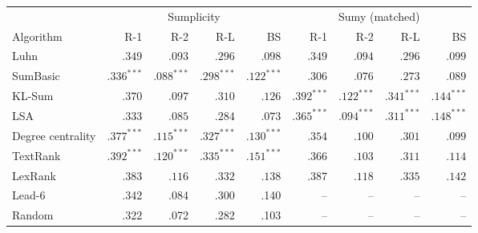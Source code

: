 \begin{tabular}{l r r r r r r r r}
\toprule
 & \multicolumn{4}{c}{Sumplicity} & \multicolumn{4}{c}{Sumy (matched)} \\
\cmidrule(lr){2-5}\cmidrule(lr){6-9}
Algorithm & R-1 & R-2 & R-L & BS & R-1 & R-2 & R-L & BS \\
\midrule
Luhn & $.349$ & $.093$ & $.296$ & $.098$ & $.349$ & $.094$ & $.296$ & $.099$ \\
SumBasic & $\mathbf{.336}^{***}$ & $\mathbf{.088}^{***}$ & $\mathbf{.298}^{***}$ & $\mathbf{.122}^{***}$ & $.306$ & $.076$ & $.273$ & $.089$ \\
KL-Sum & $.370$ & $.097$ & $.310$ & $.126$ & $\mathbf{.392}^{***}$ & $\mathbf{.122}^{***}$ & $\mathbf{.341}^{***}$ & $\mathbf{.144}^{***}$ \\
LSA & $.333$ & $.085$ & $.284$ & $.073$ & $\mathbf{.365}^{***}$ & $\mathbf{.094}^{***}$ & $\mathbf{.311}^{***}$ & $\mathbf{.148}^{***}$ \\
Degree centrality & $\mathbf{.377}^{***}$ & $\mathbf{.115}^{***}$ & $\mathbf{.327}^{***}$ & $\mathbf{.130}^{***}$ & $.354$ & $.100$ & $.301$ & $.099$ \\
TextRank & $\mathbf{.392}^{***}$ & $\mathbf{.120}^{***}$ & $\mathbf{.335}^{***}$ & $\mathbf{.151}^{***}$ & $.366$ & $.103$ & $.311$ & $.114$ \\
LexRank & $.383$ & $.116$ & $.332$ & $.138$ & $.387$ & $.118$ & $.335$ & $.142$ \\
\midrule
Lead-6 & .342 & .084 & .300 & .140 & -- & -- & -- & -- \\
Random & .322 & .072 & .282 & .103 & -- & -- & -- & -- \\
\bottomrule
\end{tabular}

